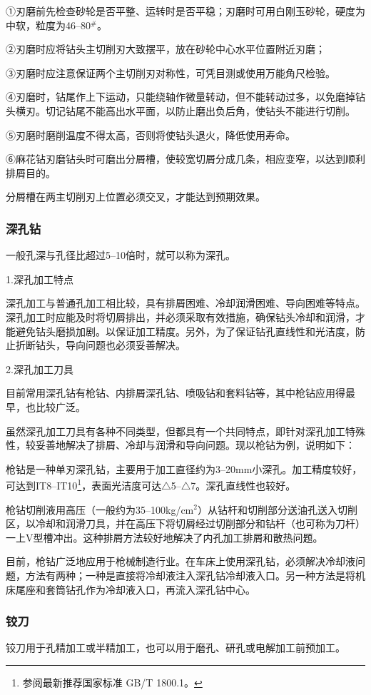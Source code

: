 \documentclass{ctexbook}
\begin{document}
①刃磨前先检查砂轮是否平整、运转时是否平稳；刃磨时可用白刚玉砂轮，硬度为中软，粒度为46--80$^{\#}$。

②刃磨时应将钻头主切削刃大致摆平，放在砂轮中心水平位置附近刃磨；

③刃磨时应注意保证两个主切削刃对称性，可凭目测或使用万能角尺检验。

④刃磨时，钻尾作上下运动，只能绕轴作微量转动，但不能转动过多，以免磨掉钻头横刃。切记钻尾不能高出水平面，以防止磨出负后角，使钻头不能进行切削。

⑤刃磨时磨削温度不得太高，否则将使钻头退火，降低使用寿命。

⑥麻花钻刃磨钻头时可磨出分屑槽，使较宽切屑分成几条，相应变窄，以达到顺利排屑目的。

分屑槽在两主切削刃上位置必须交叉，才能达到预期效果。
\subsubsection{深孔钻}
一般孔深与孔径比超过5--10倍时，就可以称为深孔。

1.深孔加工特点

深孔加工与普通孔加工相比较，具有排屑困难、冷却润滑困难、导向困难等特点。深孔加工时应能及时将切屑排出，并必须采取有效措施，确保钻头冷却和润滑，才能避免钻头磨损加剧。以保证加工精度。另外，为了保证钻孔直线性和光洁度，防止折断钻头，导向问题也必须妥善解决。

2.深孔加工刀具

目前常用深孔钻有枪钻、内排屑深孔钻、喷吸钻和套料钻等，其中枪钻应用得最早，也比较广泛。

虽然深孔加工刀具有各种不同类型，但都具有一个共同特点，即针对深孔加工特殊性，较妥善地解决了排屑、冷却与润滑和导向问题。现以枪钻为例，说明如下：

枪钻是一种单刃深孔钻，主要用于加工直径约为3--20mm小深孔。加工精度较好，可达到IT8--IT10\footnote{参阅最新推荐国家标准 GB/T 1800.1。}，表面光洁度可达$\bigtriangleup$5--$\bigtriangleup$7。深孔直线性也较好。

枪钻切削液用高压（一般约为35--100kg/cm$^2$）从钻杆和切削部分送油孔送入切削区，以冷却和润滑刀具，并在高压下将切屑经过切削部分和钻杆（也可称为刀杆）一上V型槽冲出。这种排屑方法较好地解决了内孔加工排屑和散热问题。

目前，枪钻广泛地应用于枪械制造行业。在车床上使用深孔钻，必须解决冷却液问题，方法有两种；一种是直接将冷却液注入深孔钻冷却液入口。另一种方法是将机床尾座和套筒钻孔作为冷却液入口，再流入深孔钻中心。
\subsubsection{铰刀}
铰刀用于孔精加工或半精加工，也可以用于磨孔、研孔或电解加工前预加工。
\end{document}

